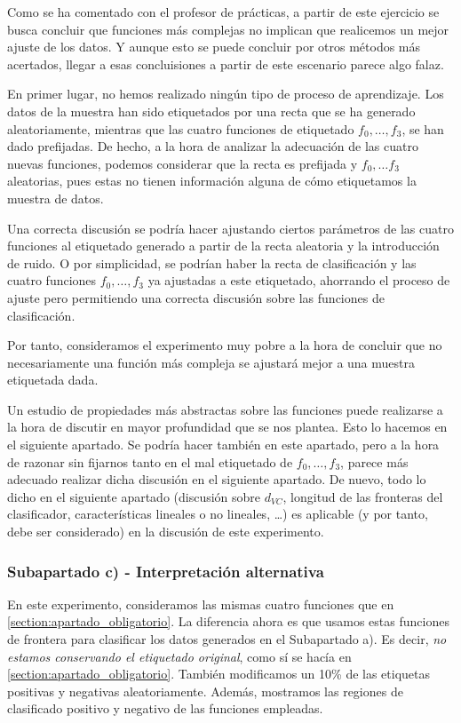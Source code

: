 \documentclass[11pt]{article}
\begin{document}
Como se ha comentado con el profesor de prácticas, a partir de este ejercicio se busca concluir que funciones más complejas no implican que realicemos un mejor ajuste de los datos. Y aunque esto se puede concluir por otros métodos más acertados, llegar a esas concluisiones a partir de este escenario parece algo falaz.

En primer lugar, no hemos realizado ningún tipo de proceso de aprendizaje. Los datos de la muestra han sido etiquetados por una recta que se ha generado aleatoriamente, mientras que las cuatro funciones de etiquetado $f_0, \ldots, f_3$, se han dado prefijadas. De hecho, a la hora de analizar la adecuación de las cuatro nuevas funciones, podemos considerar que la recta es prefijada y $f_0, \ldots f_3$ aleatorias, pues estas no tienen información alguna de cómo etiquetamos la muestra de datos.

Una correcta discusión se podría hacer ajustando ciertos parámetros de las cuatro funciones al etiquetado generado a partir de la recta aleatoria y la introducción de ruido. O por simplicidad, se podrían haber la recta de clasificación y las cuatro funciones $f_0, \ldots, f_3$ ya ajustadas a este etiquetado, ahorrando el proceso de ajuste pero permitiendo una correcta discusión sobre las funciones de clasificación.

Por tanto, consideramos el experimento muy pobre a la hora de concluir que no necesariamente una función más compleja se ajustará mejor a una muestra etiquetada dada.

Un estudio de propiedades más abstractas sobre las funciones puede realizarse a la hora de discutir en mayor profundidad que se nos plantea. Esto lo hacemos en el siguiente apartado. Se podría hacer también en este apartado, pero a la hora de razonar sin fijarnos tanto en el mal etiquetado de $f_0, \ldots, f_3$, parece más adecuado realizar dicha discusión en el siguiente apartado. De nuevo, todo lo dicho en el siguiente apartado (discusión sobre $d_{VC}$, longitud de las fronteras del clasificador, características lineales o no lineales, \ldots) es aplicable (y por tanto, debe ser considerado) en la discusión de este experimento.

\subsubsection{Subapartado c) - Interpretación alternativa} \label{section:apartado_extra}

En este experimento, consideramos las mismas cuatro funciones que en \ref{section:apartado_obligatorio}. La diferencia ahora es que usamos estas funciones de frontera para clasificar los datos generados en el Subapartado a). Es decir, \emph{no estamos conservando el etiquetado original}, como sí se hacía en \ref{section:apartado_obligatorio}. También modificamos un 10\% de las etiquetas positivas y negativas aleatoriamente. Además, mostramos las regiones de clasificado positivo y negativo de las funciones empleadas.
\end{document}

